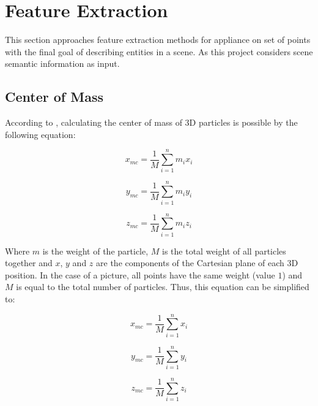 \section{Feature Extraction}

    This section approaches feature extraction methods for appliance on set of points with the final goal of describing entities in a scene. As this project considers scene semantic information as input. 
    
\subsection{Center of Mass}

    According to \cite[p. 219]{halliday-Mass-Center}, calculating the center of mass of 3D particles is possible by the following equation:
    
    \begin{equation}\label{eq:MassCenterX1}
    x_{mc} = \frac{1}{M}\sum_{i=1}^{n}m_{i}x_{i} 
    \end{equation}
    
    \begin{equation}\label{eq:MassCenterY1}
    y_{mc} = \frac{1}{M}\sum_{i=1}^{n}m_{i}y_{i}
    \end{equation}
    
    \begin{equation}\label{eq:MassCenterZ1}
    z_{mc} = \frac{1}{M}\sum_{i=1}^{n}m_{i}z_{i}
    \end{equation}
    
    Where \(m\) is the weight of the particle, \(M\) is the total weight of all particles together and \(x\), \(y\) and \(z\) are the components of the Cartesian plane of each 3D position. In the case of a picture, all points have the same weight (value \(1\)) and \(M\) is equal to the total number of particles. Thus, this equation can be simplified to:
    
    \begin{equation}\label{eq:MassCenterX2}
    x_{mc} = \frac{1}{M}\sum_{i=1}^{n}x_{i} 
    \end{equation}
    
    \begin{equation}\label{eq:MassCenterY2}
    y_{mc} = \frac{1}{M}\sum_{i=1}^{n}y_{i}
    \end{equation}
    
    \begin{equation}\label{eq:MassCenterZ2}
    z_{mc} = \frac{1}{M}\sum_{i=1}^{n}z_{i}
    \end{equation}
    
